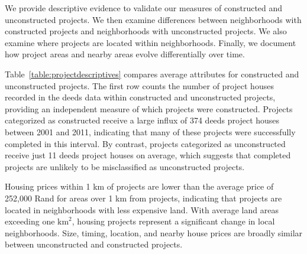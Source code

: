 \documentclass[12pt]{article}
\begin{document}






We provide descriptive evidence to validate our measures of constructed and unconstructed projects.  We then examine differences between neighborhoods with constructed projects and neighborhoods with unconstructed projects.  We also examine where projects are located within neighborhoods.  Finally, we document how project areas and nearby areas evolve differentially over time.  

Table~\ref{table:projectdescriptives} compares average attributes for constructed and unconstructed projects.  The first row counts the number of project houses recorded in the deeds data within constructed and unconstructed projects, providing an independent measure of which projects were constructed.  Projects categorized as constructed receive a large influx of 374 deeds project houses between 2001 and 2011, indicating that many of these projects were successfully completed in this interval.  By contrast, projects categorized as unconstructed receive just 11 deeds project houses on average, which suggests that completed projects are unlikely to be misclassified as unconstructed projects.   

Housing prices within 1 km of projects are lower than the average price of 252,000 Rand for areas over 1 km from projects, indicating that projects are located in neighborhoods with less expensive land.  With average land areas exceeding one $\text{km}^{2}$, housing projects represent a significant change in local neighborhoods.  Size, timing, location, and nearby house prices are broadly similar between unconstructed and constructed projects.  
\end{document}
